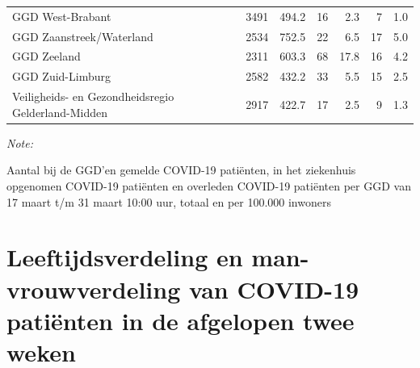 \documentclass[
  english,
  man,floatsintext]{apa6}
\begin{document}
\begin{table}
\begin{threeparttable}
\begin{tabular}{lrrrrrr}
GGD West-Brabant & 3491 & 494.2 & 16 & 2.3 & 7 & 1.0\\
GGD Zaanstreek/Waterland & 2534 & 752.5 & 22 & 6.5 & 17 & 5.0\\
GGD Zeeland & 2311 & 603.3 & 68 & 17.8 & 16 & 4.2\\
GGD Zuid-Limburg & 2582 & 432.2 & 33 & 5.5 & 15 & 2.5\\
Veiligheids- en Gezondheidsregio Gelderland-Midden & 2917 & 422.7 & 17 & 2.5 & 9 & 1.3\\
\bottomrule
\end{tabular}
\begin{tablenotes}
\item \textit{Note: } 
\item Aantal bij de GGD’en gemelde COVID-19 patiënten, in het ziekenhuis opgenomen COVID-19 patiënten en overleden COVID-19 patiënten per GGD van 17 maart t/m 31 maart 10:00 uur, totaal en per 100.000 inwoners
\end{tablenotes}
\end{threeparttable}
\endgroup{}
\end{table}

\newpage

\hypertarget{leeftijdsverdeling-en-man-vrouwverdeling-van-covid-19-patiuxebnten-in-de-afgelopen-twee-weken}{%
\section{Leeftijdsverdeling en man-vrouwverdeling van COVID-19 patiënten in de afgelopen twee weken}\label{leeftijdsverdeling-en-man-vrouwverdeling-van-covid-19-patiuxebnten-in-de-afgelopen-twee-weken}}
\end{document}
